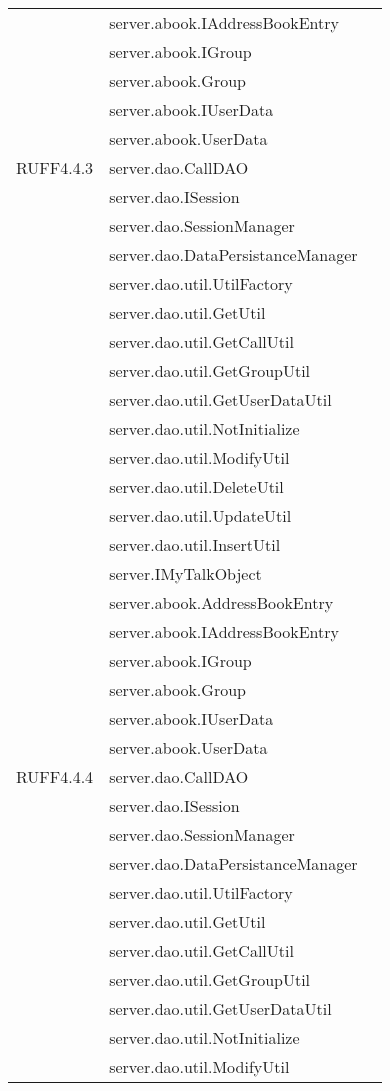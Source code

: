 \begin{center}
\begin{longtable}{lp{}l}
& server.abook.IAddressBookEntry\\
& server.abook.IGroup\\
& server.abook.Group\\
& server.abook.IUserData\\
& server.abook.UserData\\
RUFF4.4.3 & server.dao.CallDAO\\
& server.dao.ISession\\
& server.dao.SessionManager\\
& server.dao.DataPersistanceManager\\
& server.dao.util.UtilFactory\\
& server.dao.util.GetUtil\\
& server.dao.util.GetCallUtil\\
& server.dao.util.GetGroupUtil\\
& server.dao.util.GetUserDataUtil\\
& server.dao.util.NotInitialize\\
& server.dao.util.ModifyUtil\\
& server.dao.util.DeleteUtil\\
& server.dao.util.UpdateUtil\\
& server.dao.util.InsertUtil\\
& server.IMyTalkObject\\
& server.abook.AddressBookEntry\\
& server.abook.IAddressBookEntry\\
& server.abook.IGroup\\
& server.abook.Group\\
& server.abook.IUserData\\
& server.abook.UserData\\
RUFF4.4.4 & server.dao.CallDAO\\
& server.dao.ISession\\
& server.dao.SessionManager\\
& server.dao.DataPersistanceManager\\
& server.dao.util.UtilFactory\\
& server.dao.util.GetUtil\\
& server.dao.util.GetCallUtil\\
& server.dao.util.GetGroupUtil\\
& server.dao.util.GetUserDataUtil\\
& server.dao.util.NotInitialize\\
& server.dao.util.ModifyUtil\\

\end{longtable}
\end{center}
